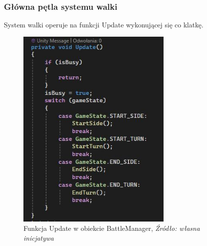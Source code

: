\documentclass{SGGW-thesis}
\begin{document}
\subsubsection{Główna pętla systemu walki}
\label{petlagry}
System walki operuje na funkcji Update wykonującej się co klatkę.
\begin{figure}[H]
  \centering
  \includegraphics[height=10cm]{updatebattle.JPG}
  \caption{Funkcja Update w obiekcie BattleManager, \textit{Źródło: własna inicjatywa}}
  \label{fig:UpdateBattle}
\end{figure}
\end{document}
